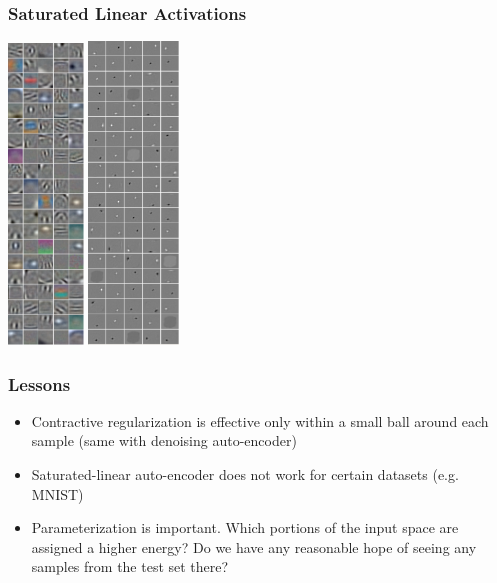 \documentclass{beamer}
\begin{document}
\begin{frame}
\frametitle{Saturated Linear Activations} 
\begin{center} 
\includegraphics[width=0.15\textwidth]{./images/SATAE/CIFAR_sat_linear03.png} \hspace{1cm} 
\includegraphics[width=0.18\textwidth]{./images/SATAE/MNIST_sat_linear_full.png}
\end{center} 
\end{frame} 

\begin{frame}
\frametitle{Lessons} 
\begin{itemize} 
\item Contractive regularization is effective only within a small ball around each sample (same with denoising auto-encoder)
\item Saturated-linear auto-encoder does not work for certain datasets (e.g. MNIST)
\item Parameterization is important. Which portions of the input space are assigned a higher energy? Do we have any reasonable hope of seeing any samples from the test set there?  
\end{itemize} 
\end{frame}
\end{document}
